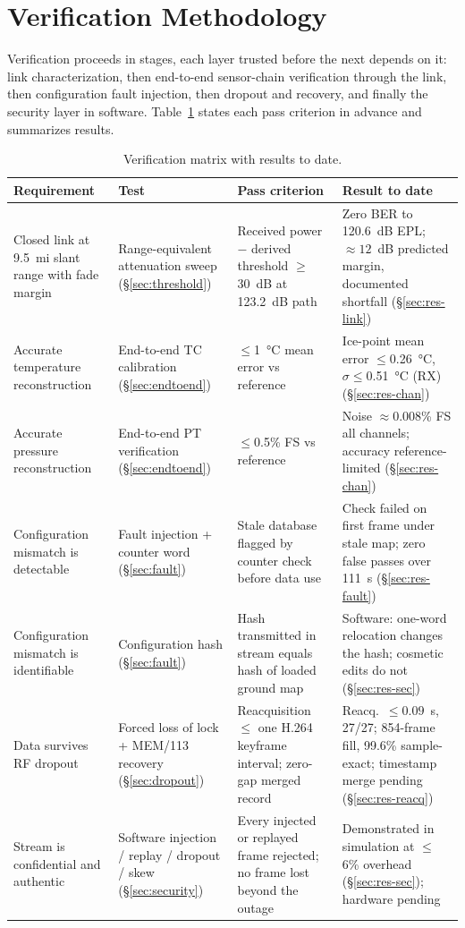 \documentclass[12pt,letterpaper]{article}
\begin{document}
\section{Verification Methodology}\label{sec:methodology}

Verification proceeds in stages, each layer trusted before the next depends on it: link
characterization, then end-to-end sensor-chain verification through the link, then
configuration fault injection, then dropout and recovery, and finally the security layer
in software. Table~\ref{tab:matrix} states each pass criterion in advance and summarizes
results.

\begin{table}[htbp]
  \centering
  \caption{Verification matrix with results to date.}
  \label{tab:matrix}
  \footnotesize
  \begin{tabular}{p{3.0cm}p{3.3cm}p{3.6cm}p{4.5cm}}
    \toprule
    Requirement & Test & Pass criterion & Result to date \\
    \midrule
    Closed link at 9.5~mi slant range with fade margin &
    Range-equivalent attenuation sweep (\S\ref{sec:threshold}) &
    Received power $-$ derived threshold $\ge$ 30~dB at 123.2~dB path &
    Zero BER to 120.6~dB EPL; ${\approx}12$~dB predicted margin, documented shortfall (\S\ref{sec:res-link}) \\
    Accurate temperature reconstruction &
    End-to-end TC calibration (\S\ref{sec:endtoend}) &
    $\le$1~\si{\celsius} mean error vs reference &
    Ice-point mean error $\le$0.26~\si{\celsius}, $\sigma \le$0.51~\si{\celsius} (RX) (\S\ref{sec:res-chan}) \\
    Accurate pressure reconstruction &
    End-to-end PT verification (\S\ref{sec:endtoend}) &
    $\le$0.5\% FS vs reference &
    Noise $\approx$0.008\% FS all channels; accuracy reference-limited (\S\ref{sec:res-chan}) \\
    Configuration mismatch is detectable &
    Fault injection + counter word (\S\ref{sec:fault}) &
    Stale database flagged by counter check before data use &
    Check failed on first frame under stale map; zero false passes over 111~s (\S\ref{sec:res-fault}) \\
    Configuration mismatch is identifiable &
    Configuration hash (\S\ref{sec:fault}) &
    Hash transmitted in stream equals hash of loaded ground map &
    Software: one-word relocation changes the hash; cosmetic edits do not (\S\ref{sec:res-sec}) \\
    Data survives RF dropout &
    Forced loss of lock + MEM/113 recovery (\S\ref{sec:dropout}) &
    Reacquisition $\le$ one H.264 keyframe interval; zero-gap merged record &
    Reacq.\ ${\le}0.09$~s, 27/27; 854-frame fill, 99.6\% sample-exact; timestamp merge pending (\S\ref{sec:res-reacq}) \\
    Stream is confidential and authentic &
    Software injection / replay / dropout / skew (\S\ref{sec:security}) &
    Every injected or replayed frame rejected; no frame lost beyond the outage &
    Demonstrated in simulation at $\le$6\% overhead (\S\ref{sec:res-sec}); hardware pending \\
    \bottomrule
  \end{tabular}
\end{table}
\end{document}
